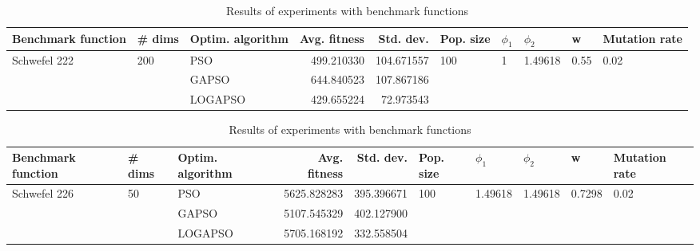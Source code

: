 \documentclass{article}
\begin{document}
\begin{table}
\centering
\caption{Results of experiments with benchmark functions}
\begin{tabular}{lllrrlllll}
\toprule
           Benchmark function &              \# dims & Optim. algorithm &  Avg. fitness &  Std. dev. &            Pop. size &         $\phi_{1}$ &               $\phi_{2}$ &                     w &         Mutation rate \\
\midrule
\multirow{3}{*}{Schwefel 222} & \multirow{3}{*}{200} &              PSO &    499.210330 & 104.671557 & \multirow{3}{*}{100} & \multirow{3}{*}{1} & \multirow{3}{*}{1.49618} & \multirow{3}{*}{0.55} & \multirow{3}{*}{0.02} \\
                              &                      &            GAPSO &    644.840523 & 107.867186 &                      &                    &                          &                       &                       \\
                              &                      &          LOGAPSO &    429.655224 &  72.973543 &                      &                    &                          &                       &                       \\
\bottomrule
\end{tabular}
\end{table}
\begin{table}
\centering
\caption{Results of experiments with benchmark functions}
\begin{tabular}{lllrrlllll}
\toprule
           Benchmark function &             \# dims & Optim. algorithm &  Avg. fitness &  Std. dev. &            Pop. size &               $\phi_{1}$ &               $\phi_{2}$ &                       w &         Mutation rate \\
\midrule
\multirow{3}{*}{Schwefel 226} & \multirow{3}{*}{50} &              PSO &   5625.828283 & 395.396671 & \multirow{3}{*}{100} & \multirow{3}{*}{1.49618} & \multirow{3}{*}{1.49618} & \multirow{3}{*}{0.7298} & \multirow{3}{*}{0.02} \\
                              &                     &            GAPSO &   5107.545329 & 402.127900 &                      &                          &                          &                         &                       \\
                              &                     &          LOGAPSO &   5705.168192 & 332.558504 &                      &                          &                          &                         &                       \\
\bottomrule
\end{tabular}
\end{table}
\end{document}
